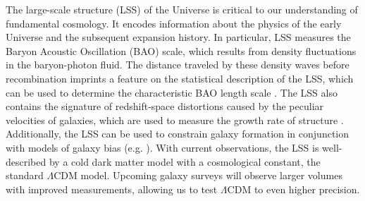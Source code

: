 \documentclass[modern]{aastex62}
\newcommand{\cf}{2pcf\xspace} %
\newcommand{\KSF}[1]{\textcolor{teal}{KSF says: #1}}
\begin{document}
The large-scale structure (LSS) of the Universe is critical to our understanding of fundamental cosmology. 
It encodes information about the physics of the early Universe and the subsequent expansion history.
In particular, LSS measures the Baryon Acoustic Oscillation (BAO) scale, which results from density fluctuations in the baryon-photon fluid.
The distance traveled by these density waves before recombination imprints a feature on the statistical description of the LSS, which can be used to determine the characteristic BAO length scale \citep{EisensteinHu1998}.
The LSS also contains the signature of redshift-space distortions caused by the peculiar velocities of galaxies, which are used to measure the growth rate of structure \citep{Kaiser1987}.
Additionally, the LSS can be used to constrain galaxy formation in conjunction with models of galaxy bias (e.g. \citealt{Hamilton1988}). %
With current observations, the LSS is well-described by a cold dark matter model with a cosmological constant, the standard $\Lambda$CDM model.
Upcoming galaxy surveys will observe larger volumes with improved measurements, allowing us to test $\Lambda$CDM to even higher precision.

\end{document}
